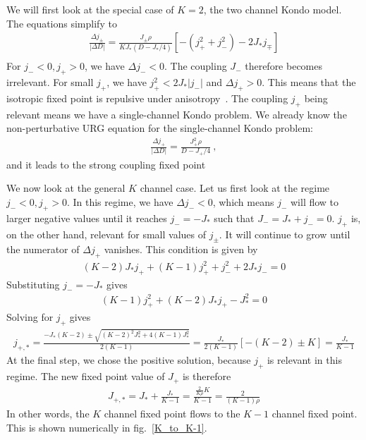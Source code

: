 \documentclass[12pt]{revtex4-2}
\begin{document}
We will first look at the special case of \(K=2\), the two channel Kondo model. The equations simplify to
\begin{align}
	\frac{\Delta j_\pm}{|\Delta D|} = \frac{J_\pm \rho}{K J_*\left(D - J_*/4\right)}\left[- \left(j_+^2 + j_-^2\right) - 2J_* j_\mp\right]\\
\end{align}
For \(j_- < 0, j_+ > 0\), we have \(\Delta j_- < 0\). The coupling \(J_-\) therefore becomes irrelevant. For small \(j_+\), we have \(j_+^2 < 2J_* |j_-|\)  and \(\Delta j_+ > 0\). This means that the isotropic fixed point is repulsive under anisotropy~\cite{Noz_blandin_1980}. The coupling \(j_+\) being relevant means we have a single-channel Kondo problem. We already know the non-perturbative URG equation for the single-channel Kondo problem:
\begin{align}
	\frac{\Delta j_+}{|\Delta D|} = \frac{J_+^2 \rho}{D - J_+/4}~,
\end{align}
and it leads to the strong coupling fixed point

We now look at the general \(K\) channel case. Let us first look at the regime \(j_- < 0, j_+ > 0\). In this regime, we have \(\Delta j_- < 0\), which means \(j_-\) will flow to larger negative values until it reaches \(j_- = -J_*\) such that \(J_- = J_* + j_- = 0\). \(j_+\) is, on the other hand, relevant for small values of \(j_\pm\). It will continue to grow until the numerator of \(\Delta j_+\) vanishes. This condition is given by
\begin{align}
	\left(K - 2\right)J_*j_+ + (K-1)j_+^2 + j_-^2 + 2J_* j_- = 0
\end{align}
Substituting \(j_- = -J_*\) gives
\begin{align}
	(K-1)j_+^2 + \left(K - 2\right)J_*j_+ - J_*^2 = 0
\end{align}
Solving for \(j_+\) gives
\begin{align}
	j_{+,*} = \frac{-J_*(K-2) \pm \sqrt{(K-2)^2 J_*^2 + 4(K-1)J_*^2}}{2(K-1)} = \frac{J_*}{2(K-1)}\left[-(K-2) \pm K\right] = \frac{J_*}{K-1}
\end{align}
At the final step, we chose the positive solution, because \(j_+\) is relevant in this regime. The new fixed point value of \(J_+\) is therefore
\begin{align}
	J_{+,*} = J_* + \frac{J_*}{K-1} = \frac{\frac{2}{K \rho} K}{K - 1} = \frac{2}{(K-1)\rho}
\end{align}
In other words, the \(K\) channel fixed point flows to the \(K-1\) channel fixed point. This is shown numerically in fig.~\ref{K_to_K-1}.
\end{document}
